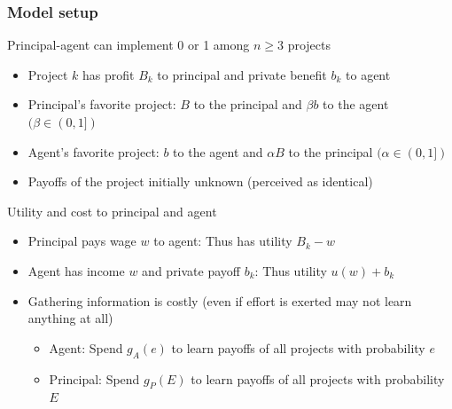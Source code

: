 \documentclass[aspectratio=169]{beamer}
\begin{document}
\begin{frame}
\frametitle{Model setup} 
Principal-agent can implement 0 or 1 among $n\geq 3$ projects
\begin{itemize}\setlength\itemsep{3pt}
\item Project $k$ has profit $B_k$ to principal and private benefit $b_k$ to agent
\item Principal's favorite project: $B$ to the principal and $\beta b$ to the agent $(\beta\in(0,1])$
\item Agent's favorite project: $b$ to the agent and $\alpha B$ to the principal  $(\alpha\in(0,1])$
\item Payoffs of the project initially unknown (perceived as identical)
\end{itemize}\medskip 
Utility and cost to principal and agent
\begin{itemize}\setlength\itemsep{3pt}
\item Principal pays wage $w$ to agent: Thus has utility $B_k-w$
\item Agent has income $w$ and private payoff $b_k$: Thus utility $u(w)+b_k$
\item Gathering information is costly (even if effort is exerted may not learn anything at all)
\begin{itemize}\setlength\itemsep{3pt}
\item Agent: Spend $g_A(e)$ to learn payoffs of all projects with probability $e$ 
\item Principal: Spend $g_P(E)$ to learn payoffs of all projects with probability $E$ 
\end{itemize}
\end{itemize}\medskip 
\end{frame}
\end{document}

